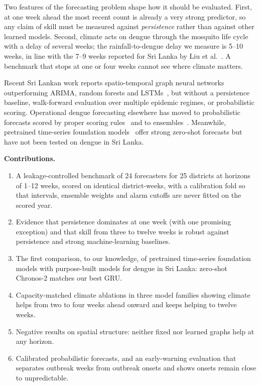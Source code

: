 Two features of the forecasting problem shape how it should be evaluated. First, at one week ahead the most recent count is already a very strong predictor, so any claim of skill must be measured against \emph{persistence} rather than against other learned models. Second, climate acts on dengue through the mosquito life cycle with a delay of several weeks; the rainfall-to-dengue delay we measure is 5--10 weeks, in line with the 7--9 weeks reported for Sri Lanka by Liu et al.~\cite{liu2025explainable}. A benchmark that stops at one or four weeks cannot see where climate matters.

Recent Sri Lankan work reports spatio-temporal graph neural networks outperforming ARIMA, random forests and LSTMs~\cite{weng2024graph,gulmohamed2026denguegnn}, but without a persistence baseline, walk-forward evaluation over multiple epidemic regimes, or probabilistic scoring. Operational dengue forecasting elsewhere has moved to probabilistic forecasts scored by proper scoring rules~\cite{johansson2019open,bracher2021evaluating,mosqlimate2026sprint} and to ensembles~\cite{colongonzalez2021probabilistic}. Meanwhile, pretrained time-series foundation models~\cite{ansari2024chronos,ansari2025chronos2} offer strong zero-shot forecasts but have not been tested on dengue in Sri Lanka.

\textbf{Contributions.}
\begin{enumerate}
\item A leakage-controlled benchmark of 24 forecasters for 25 districts at horizons of 1--12 weeks, scored on identical district-weeks, with a calibration fold so that intervals, ensemble weights and alarm cutoffs are never fitted on the scored year.
\item Evidence that persistence dominates at one week (with one promising exception) and that skill from three to twelve weeks is robust against persistence and strong machine-learning baselines.
\item The first comparison, to our knowledge, of pretrained time-series foundation models with purpose-built models for dengue in Sri Lanka: zero-shot Chronos-2 matches our best GRU.
\item Capacity-matched climate ablations in three model families showing climate helps from two to four weeks ahead onward and keeps helping to twelve weeks.
\item Negative results on spatial structure: neither fixed nor learned graphs help at any horizon.
\item Calibrated probabilistic forecasts, and an early-warning evaluation that separates outbreak weeks from outbreak onsets and shows onsets remain close to unpredictable.
\end{enumerate}

